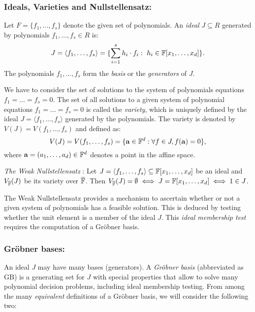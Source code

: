\subsubsection{Ideals, Varieties and Nullstellensatz:} 
Let $F = \{f_1, \dots, f_s\}$ denote the given set of polynomials. An
{\it ideal} $J \subseteq R$ generated by polynomials $f_1, \dots, f_s \in R$
is: \vspace{-0.1in} 
$$J = \langle f_1, \dots, f_s \rangle = \{\sum_{i=1}^{s} h_i\cdot f_i:
~h_i \in {\mathbb{F}}[x_1,\dots,   x_d]\}.$$  %
The polynomials $f_1, \dots, f_s$ form the {\it basis} or the {\it
  generators} of $J$.  

We have to consider the set of solutions to the system of polynomials
equations $f_1 = \dots = f_s = 0$. The set of all solutions to a
given system of polynomial equations $f_1 = \dots = f_s = 0$ is called
the {\it variety}, which is uniquely defined by the ideal 
$J = \langle f_1,\dots,f_s\rangle$ generated by
the polynomials. The variety is denoted by $V(J)=V(f_1,\dots,f_s)$ and
defined as: 
$$V(J) = V(f_1, \dots, f_s) = \{\mathbf{a} \in {\mathbb{F}}^d: \forall
f \in J, f(\mathbf{a}) = 0\},$$ 
where $\mathbf{a} = (a_1, \dots, a_d) \in {\mathbb{F}} ^d$ denotes a point in
the affine space.

\begin{theorem} \label{thm:weak-ns}
{\it The Weak Nullstellensatz} \cite{ideals:book}: 
Let $J = \langle f_1,\dots, f_s \rangle \subseteq {\mathbb{F}}[x_1, \dots, x_d]$ be
an ideal and $V_{\overline{\mathbb{F}}}(J)$ be its variety over $\overline{\mathbb{F}}$. Then
$V_{\overline{\mathbb{F}}}(J) = \emptyset \iff J = {\mathbb{F}}[x_1,\dots,x_d] \iff 1 \in J$. 
\end{theorem}

The Weak Nullstellensatz provides a mechanism to ascertain whether or not
a given system of polynomials has a feasible solution. This is deduced
by testing whether the unit element is a member of the ideal $J$. This
{\it ideal membership test} requires the computation of a Gr\"obner
basis. 

\subsubsection{Gr\"obner bases:} An ideal $J$ may have many bases
(generators). A {\it Gr\"obner basis} (abbreviated as GB) is a generating set for $J$
with special properties that allow to solve many polynomial decision
problems, including ideal membership testing. From among the many
{\it equivalent} definitions of a Gr\"obner basis, we will consider the
following two:

